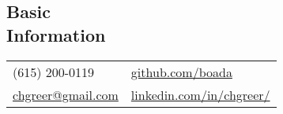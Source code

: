 \documentclass[margin,line, 11pt]{res}
\begin{document}

\begin{resume}
\vspace*{-2mm}
\section{Basic\\Information}
\begin{tabular}{@{}p{4.9in}p{4in}}
  (615) 200-0119 & \href{https://github.com/boada}{github.com/boada} \\
  \href{mailto:chgreer@gmail.com}{chgreer@gmail.com} & \href{https://www.linkedin.com/in/chgreer/}{linkedin.com/in/chgreer/} \\
\end{tabular}



\end{resume}
\end{document}
